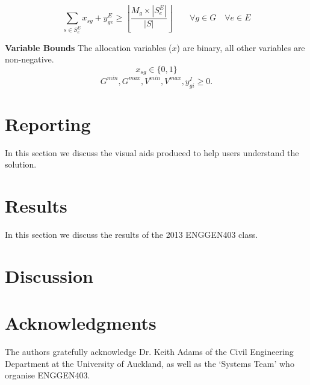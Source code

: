 \documentclass[12pt]{ORSNZ}
\begin{document}
\begin{description}
\begin{equation} \label{con2}
\sum_{s \in S^E_e} x_{sg} + y^E_{ge}  \geq \left\lfloor\frac{M_g\times |S^E_e|}{|S|}\right\rfloor \qquad \mbox{$\forall g \in G \quad \forall e \in E$}
\end{equation}

\textbf{Variable Bounds} The allocation variables ($x$) are binary, all other variables are non-negative.
\[x_{sg} \in \{0, 1\}\]
\[G^{min}, G^{max}, V^{min}, V^{max}, y^I_{gi}  \ge 0.\]

\end{description}

\section{Reporting}
	In this section we discuss the visual aids produced to help users understand the solution.

\section{Results}
	In this section we discuss the results of the 2013 ENGGEN403 class.
	
\section{Discussion}


\section*{Acknowledgments}
The authors gratefully acknowledge Dr. Keith Adams of the Civil Engineering Department at the University of Auckland, as well as the `Systems Team' who organise ENGGEN403.



\end{document}
